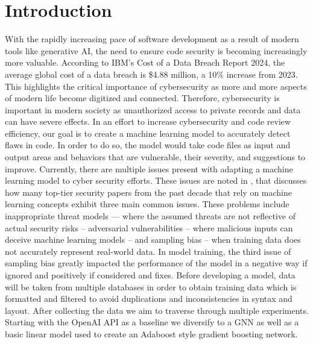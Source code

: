 \documentclass{article}
\begin{document}
\section{Introduction}
With the rapidly increasing pace of software development as a result of modern tools like generative AI,
the need to ensure code security is becoming increasingly more valuable. According to IBM's Cost of a
Data Breach Report 2024, the average global cost of a data breach is \$4.88 million, a 10\% increase from
2023. This highlights the critical importance of cybersecurity as more and more aspects of modern life become
digitized and connected. Therefore, cybersecurity is important in modern society as unauthorized access to
private records and data can have severe effects. In an effort to increase cybersecurity and code review
efficiency, our goal is to create a machine learning model to accurately detect flaws in code. In order to
do so, the model would take code files as input and output areas and behaviors that are vulnerable, their
severity, and suggestions to improve. Currently, there are multiple issues present with adapting a machine
learning model to cyber security efforts. These issues are noted in \cite{Arp2024}, that discusses how many top-tier security papers
from the past decade that rely on machine learning concepts exhibit three main common issues. These problems include inappropriate threat
models — where the assumed threats are not reflective of actual security risks – adversarial vulnerabilities
– where malicious inputs can deceive machine learning models – and sampling bias – when training data does
not accurately represent real-world data. In model training, the third issue of sampling bias greatly impacted the performance
of the model in a negative way if ignored and positively if considered and fixes. Before developing a model, data will be taken 
from multiple databases in order to obtain training data which is formatted and filtered to avoid duplications and inconsistencies
in syntax and layout. After collecting the data we aim to traverse through multiple experiments. Starting with the OpenAI API as
a baseline we diversify to a GNN as well as a basic linear model used to create an Adaboost style gradient boosting network.
\end{document}
